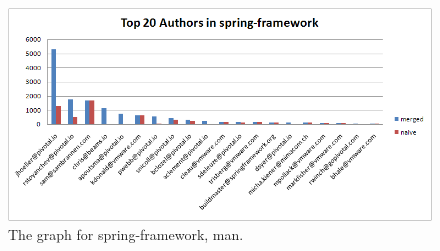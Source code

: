 \documentclass{article}
\begin{document}
\begin{figure}[h]
  \centering
  \includegraphics[width=1\textwidth]{../presentation/img/graph-spring-framework.png}
  \caption{The graph for spring-framework, man.}
  \label{fig:graph-spring-framework}
\end{figure}
\end{document}
